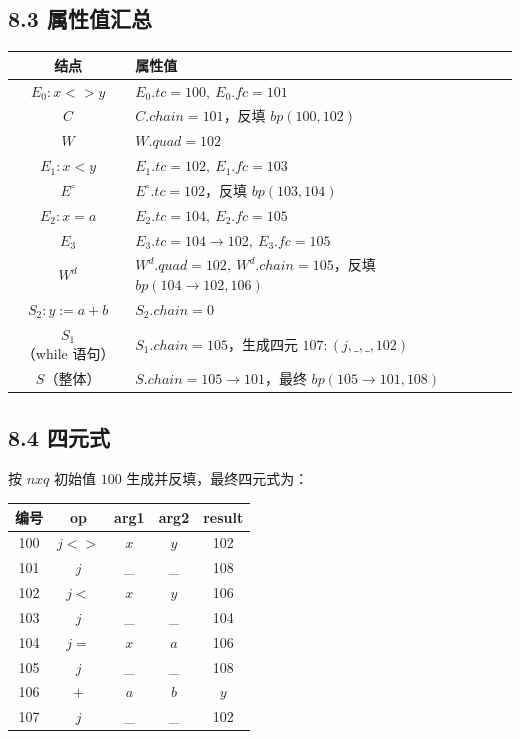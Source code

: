 \documentclass[UTF8,zihao=-4]{ctexart}
\begin{document}
\subsection*{8.3 属性值汇总}

\begin{center}
\begin{tabular}{c|l}
结点 & 属性值\\
\hline
$E_0:x<>y$ & $E_0.tc=100,\ E_0.fc=101$\\
$C$ & $C.chain=101$，反填 $bp(100,102)$\\
$W$ & $W.quad=102$\\
$E_1:x<y$ & $E_1.tc=102,\ E_1.fc=103$\\
$E^\circ$ & $E^\circ.tc=102$，反填 $bp(103,104)$\\
$E_2:x=a$ & $E_2.tc=104,\ E_2.fc=105$\\
$E_3$ & $E_3.tc=104\to102,\ E_3.fc=105$\\
$W^d$ & $W^d.quad=102,\ W^d.chain=105$，反填 $bp(104\to102,106)$\\
$S_2:y:=a+b$ & $S_2.chain=0$\\
$S_1$（while 语句） & $S_1.chain=105$，生成四元 $107:(j,\_,\_,102)$\\
$S$（整体） & $S.chain=105\to101$，最终 $bp(105\to101,108)$\\
\end{tabular}
\end{center}

\subsection*{8.4 四元式}

按 $nxq$ 初始值 $100$ 生成并反填，最终四元式为：

\begin{center}
\begin{tabular}{c|c|c|c|c}
编号 & op & arg1 & arg2 & result\\
\hline
100 & $j<>$ & $x$ & $y$ & 102\\
101 & $j$ & \_ & \_ & 108\\
102 & $j<$ & $x$ & $y$ & 106\\
103 & $j$ & \_ & \_ & 104\\
104 & $j=$ & $x$ & $a$ & 106\\
105 & $j$ & \_ & \_ & 108\\
106 & $+$ & $a$ & $b$ & $y$\\
107 & $j$ & \_ & \_ & 102
\end{tabular}
\end{center}
\end{document}
